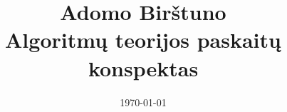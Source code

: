 \documentclass{report}
\title{%
Adomo Birštuno\\
Algoritmų teorijos paskaitų konspektas}
\author{}
\date{\today}
\theoremstyle{plain}
\theoremstyle{definition}
\theoremstyle{remark}
\theoremstyle{notation}
\begin{document}


%
%
%
%
%
%
%
%
%

\maketitle
\bigskip
\tableofcontents
\end{document}
